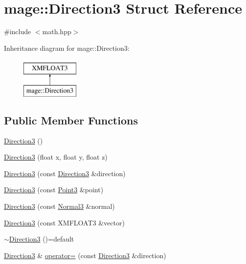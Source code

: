 \hypertarget{structmage_1_1_direction3}{}\section{mage\+:\+:Direction3 Struct Reference}
\label{structmage_1_1_direction3}


{\ttfamily \#include $<$math.\+hpp$>$}

Inheritance diagram for mage\+:\+:Direction3\+:\begin{figure}[H]
\begin{center}
\leavevmode
\includegraphics[height=2.000000cm]{structmage_1_1_direction3}
\end{center}
\end{figure}
\subsection*{Public Member Functions}
\begin{DoxyCompactItemize}
\item 
\hyperlink{structmage_1_1_direction3_a29603b6349c5a313d5bd93e0b0235ff1}{Direction3} ()
\item 
\hyperlink{structmage_1_1_direction3_a1b2cd4ce14856da23dfa9c5facc90da2}{Direction3} (float x, float y, float z)
\item 
\hyperlink{structmage_1_1_direction3_a8f6264f5a7a7590e67f4efa8f0687cdd}{Direction3} (const \hyperlink{structmage_1_1_direction3}{Direction3} \&direction)
\item 
\hyperlink{structmage_1_1_direction3_ad5680af7ed9856d3c5a2454bfec21b3b}{Direction3} (const \hyperlink{structmage_1_1_point3}{Point3} \&point)
\item 
\hyperlink{structmage_1_1_direction3_a18282959c79c93d25488d72f944495e3}{Direction3} (const \hyperlink{structmage_1_1_normal3}{Normal3} \&normal)
\item 
\hyperlink{structmage_1_1_direction3_afb66ddfb4489dd7c0bfc25c29b97df9c}{Direction3} (const X\+M\+F\+L\+O\+A\+T3 \&vector)
\item 
\hyperlink{structmage_1_1_direction3_a583c087dc366d206aaf54a33bc90c50b}{$\sim$\+Direction3} ()=default
\item 
\hyperlink{structmage_1_1_direction3}{Direction3} \& \hyperlink{structmage_1_1_direction3_a3b3251fcafc37b39bad2c89e5faa09bd}{operator=} (const \hyperlink{structmage_1_1_direction3}{Direction3} \&direction)
\end{DoxyCompactItemize}


